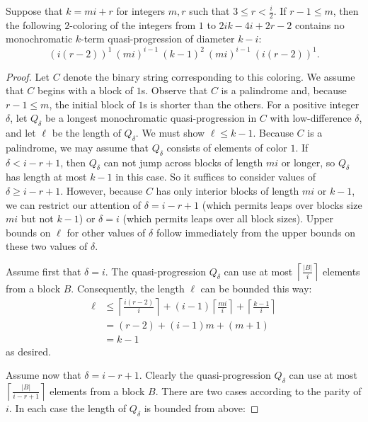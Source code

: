 \begin{theorem} \label{thm:GeneralLowerBound} Suppose that $k=mi+r$ for integers $m,r$ such that $3 \leq r < \frac{i}{2}$. If $r-1 \leq m$, then the following $2$-coloring of the integers from $1$ to $2ik-4i + 2r - 2$ contains no monochromatic $k$-term quasi-progression of diameter $k-i$: \[(i(r-2))^1 \ (mi)^{i-1}\ (k-1)^{2}\ (mi)^{i-1}\ (i(r-2))^1.\]
\end{theorem}
\begin{proof} Let $C$ denote the binary string corresponding to this coloring. We assume that $C$ begins with a block of $1$s. Observe that $C$ is a palindrome and, because $r-1 \leq m$, the initial block of $1$s is shorter than the others. For a positive integer $\delta$, let $Q_\delta$ be a longest monochromatic quasi-progression in $C$ with low-difference $\delta$, and let $\ell$ be the length of $Q_\delta$. We must show $\ell \leq k-1$. Because $C$ is a palindrome, we may assume that $Q_\delta$ consists of elements of color $1$. If $\delta < i - r + 1$, then $Q_\delta$ can not jump across blocks of length $mi$ or longer, so $Q_\delta$ has length at most $k-1$ in this case. So it suffices to consider values of $\delta \geq i-r+1$. However, because $C$ has only interior blocks of length $mi$ or $k-1$, we can restrict our attention of $\delta = i - r + 1$ (which permits leaps over blocks size $mi$ but not $k-1$) or $\delta = i$ (which permits leaps over all block sizes). Upper bounds on $\ell$ for other values of $\delta$ follow immediately from the upper bounds on these two values of $\delta$.

Assume first that $\delta = i$. The quasi-progression $Q_\delta$ can use at most $\left\lceil \frac{|B|}{i} \right\rceil$ elements from a block $B$. Consequently, the length $\ell$ can be bounded this way:
\begin{align*}
\ell &\leq \left\lceil \frac{i(r-2)}{i} \right\rceil + (i-1) \left\lceil \frac{mi}{i} \right\rceil + \left\lceil \frac{k-1}{i} \right\rceil \\
	&= (r - 2) + (i-1)m + (m + 1) \\
	&= k - 1
\end{align*}
as desired.

Assume now that $\delta = i - r + 1$. Clearly the quasi-progression $Q_\delta$ can use at most $\left\lceil \frac{|B|}{ i - r + 1} \right\rceil$ elements from a block $B$. There are two cases according to the parity of $i$. In each case the length of $Q_\delta$ is bounded from above:


\end{proof}
